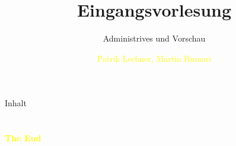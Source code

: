 \documentclass[aspectratio=43]{beamer}
\title{Eingangsvorlesung} %
\subtitle{Administrives und Vorschau}
\author[Lechner/Rumori]{\textcolor{yellow}{Patrik Lechner, Martin Rumori}}
\institute[IC\textbackslash M/T]{
    \\%
    \textcolor{white}{FH St.Pölten}%
} %
\begin{document}
    
    \frame{\titlepage}
    
    \begin{frame}{Inhalt}
        \tableofcontents
    \end{frame}
        
    
    
    
    
    
    
    
    
    

    \section{}
    \begin{frame}{}
        \centering
            \Huge\bfseries
        \textcolor{yellow}{The End}
    \end{frame}
\end{document}
